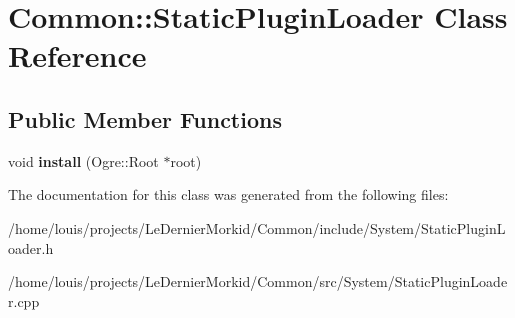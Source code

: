 \hypertarget{class_common_1_1_static_plugin_loader}{}\section{Common\+:\+:Static\+Plugin\+Loader Class Reference}
\label{class_common_1_1_static_plugin_loader}
\subsection*{Public Member Functions}
\begin{DoxyCompactItemize}
\item 
\mbox{\label{class_common_1_1_static_plugin_loader_ad53a802ca29d709d2e2731be6304d274}} 
void {\bfseries install} (Ogre\+::\+Root $\ast$root)
\end{DoxyCompactItemize}


The documentation for this class was generated from the following files\+:\begin{DoxyCompactItemize}
\item 
/home/louis/projects/\+Le\+Dernier\+Morkid/\+Common/include/\+System/Static\+Plugin\+Loader.\+h\item 
/home/louis/projects/\+Le\+Dernier\+Morkid/\+Common/src/\+System/Static\+Plugin\+Loader.\+cpp\end{DoxyCompactItemize}
